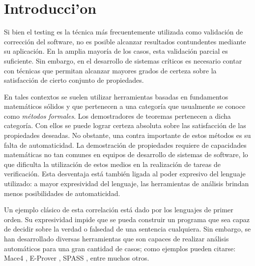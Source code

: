 \chapter{Introducci'on}


Si bien el testing es la técnica más frecuentemente utilizada como validación de corrección del software, no es posible alcanzar resultados contundentes mediante su aplicación. 
En la amplia mayoría de los casos, esta validación parcial es suficiente. 
Sin embargo, en el desarrollo de sistemas críticos es necesario contar con técnicas que permitan alcanzar mayores grados de certeza sobre la satisfacción de cierto conjunto de propiedades.

En tales contextos se suelen utilizar herramientas basadas en fundamentos matemáticos sólidos y que pertenecen a una categoría que usualmente se conoce como \emph{métodos formales}. 
Los demostradores de teoremas pertenecen a dicha categoría. 
Con ellos se puede lograr certeza absoluta sobre las satisfacción de las propiedades deseadas. 
No obstante, una contra importante de estos métodos es su falta de automaticidad. 
La demostración de propiedades requiere de capacidades matemáticas no tan comunes en equipos de desarrollo de sistemas de software, lo que dificulta la utilización de estos medios en la realización de tareas de verificación. 
Esta desventaja está también ligada al poder expresivo del lenguaje utilizado: a mayor expresividad del lenguaje, las herramientas de análisis brindan menos posibilidades de automaticidad.

Un ejemplo clásico de esta correlación está dado por los lenguajes de primer orden. 
Su expresividad impide que se pueda construir un programa que sea capaz de decidir sobre la verdad o falsedad de una sentencia cualquiera. 
Sin embargo, se han desarrollado diversas herramientas que son capaces de realizar análisis automáticos para una gran cantidad de casos; como ejemplos pueden citarse: Mace4 \cite{m05}, E-Prover \cite{s13}, SPASS \cite{spass}, entre muchos otros. 

